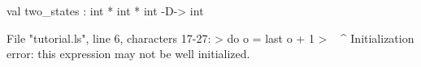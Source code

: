 \runverbatimfalse
{}
\begin{RunVerbatimMsg}
val two_states : int * int * int -D-> int
\end{RunVerbatimMsg}
\begin{RunVerbatimErr}
File "tutorial.ls", line 6, characters 17-27:
>          do o = last o + 1
>                 ^^^^^^^^^^
Initialization error: this expression may not be well initialized.
\end{RunVerbatimErr}
